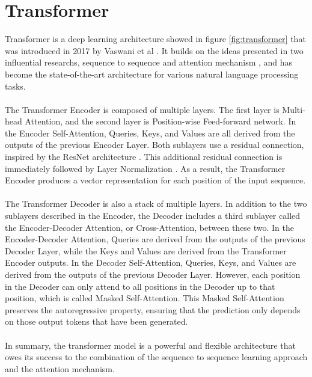 \section{Transformer}
Transformer is a deep learning architecture showed in figure \ref{fig:transformer} that was introduced in 2017 by Vaswani et al \cite{NIPS2017_3f5ee243}. It builds on the ideas presented in two influential researchs, sequence to sequence \cite{NIPS2014_a14ac55a, DBLP:journals/corr/WuSCLNMKCGMKSJL16} and attention mechanism \cite{luong-etal-2015-effective}, and has become the state-of-the-art architecture for various natural language processing tasks.\\\\
The Transformer Encoder is composed of multiple layers. The first layer is Multi-head Attention, and the second layer is Position-wise Feed-forward network. In the Encoder Self-Attention, Queries, Keys, and Values are all derived from the outputs of the previous Encoder Layer. Both sublayers use a residual connection, inspired by the ResNet architecture \cite{he2016deep}. This additional residual connection is immediately followed by Layer Normalization \cite{ba2016layer}. As a result, the Transformer Encoder produces a vector representation for each position of the input sequence.\\\\
The Transformer Decoder is also a stack of multiple layers. In addition to the two sublayers described in the Encoder, the Decoder includes a third sublayer called the Encoder-Decoder Attention, or Cross-Attention, between these two. In the Encoder-Decoder Attention, Queries are derived from the outputs of the previous Decoder Layer, while the Keys and Values are derived from the Transformer Encoder outputs. In the Decoder Self-Attention, Queries, Keys, and Values are derived from the outputs of the previous Decoder Layer. However, each position in the Decoder can only attend to all positions in the Decoder up to that position, which is called Masked Self-Attention. This Masked Self-Attention preserves the autoregressive property, ensuring that the prediction only depends on those output tokens that have been generated.\\\\
In summary, the transformer model is a powerful and flexible architecture that owes its success to the combination of the sequence to sequence learning approach and the attention mechanism.\\\\ 
